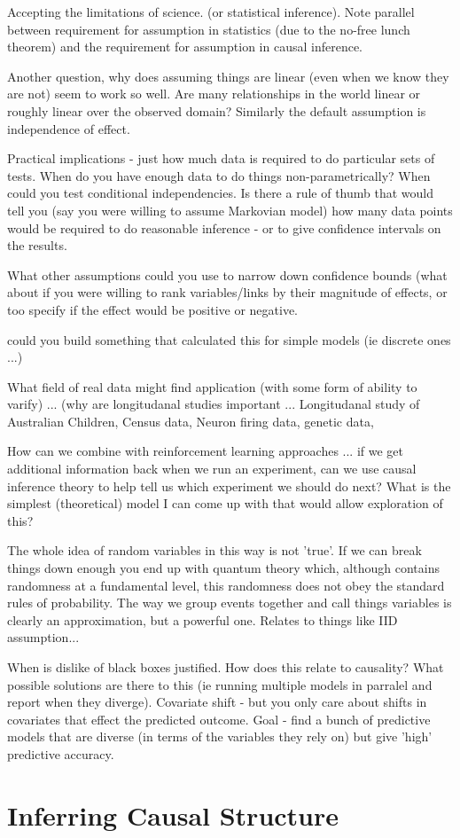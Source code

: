 \documentclass[11pt,a4paper]{article}
\begin{document}
Accepting the limitations of science. (or statistical inference). Note parallel between requirement for assumption in statistics (due to the no-free lunch theorem) and the requirement for assumption in causal inference.

Another question, why does assuming things are linear (even when we know they are not) seem to work so well. Are many relationships in the world linear or roughly linear over the observed domain? Similarly the default assumption is independence of effect. 

Practical implications - just how much data is required to do particular sets of tests. When do you have enough data to do things non-parametrically? When could you test conditional independencies. Is there a rule of thumb that would tell you (say you were willing to assume Markovian model) how many data points would be required to do reasonable inference - or to give confidence intervals on the results. 

What other assumptions could you use to narrow down confidence bounds (what about if you were willing to rank variables/links by their magnitude of effects, or too specify if the effect would be positive or negative. 

could you build something that calculated this for simple models (ie discrete ones ...)

What field of real data might find application (with some form of ability to varify) ... (why are longitudanal studies important ... Longitudanal study of Australian Children, Census data, Neuron firing data, genetic data, 

How can we combine with reinforcement learning approaches ... if we get additional information back when we run an experiment, can we use causal inference theory to help tell us which experiment we should do next? What is the simplest (theoretical) model I can come up with that would allow exploration of this?

The whole idea of random variables in this way is not 'true'. If we can break things down enough you end up with quantum theory which, although contains randomness at a fundamental level, this randomness does not obey the standard rules of probability. The way we group events together and call things variables is clearly an approximation, but a powerful one. Relates to things like IID assumption...


When is dislike of black boxes justified. How does this relate to causality? What possible solutions are there to this (ie running multiple models in parralel and report when they diverge). Covariate shift - but you only care about shifts in covariates that effect the predicted outcome. Goal - find a bunch of predictive models that are diverse (in terms of the variables they rely on) but give 'high' predictive accuracy. 





\section*{Inferring Causal Structure}
\end{document}
